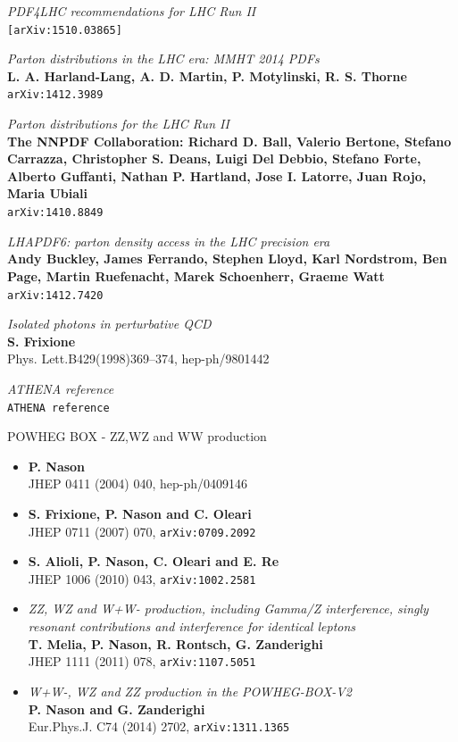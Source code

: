 \documentclass[11pt,a4paper,final]{report}
\begin{document}
\begin{thebibliography}{9}
	\textit{PDF4LHC recommendations for LHC Run II}\\
	\texttt{[arXiv:1510.03865]}	
	
	\textit{Parton distributions in the LHC era: MMHT 2014 PDFs}\\
	\textbf{L. A. Harland-Lang, A. D. Martin, P. Motylinski, R. S. Thorne}\\
	\texttt{arXiv:1412.3989}
	
	\textit{Parton distributions for the LHC Run II}\\
	\textbf{The NNPDF Collaboration: Richard D. Ball, Valerio Bertone, Stefano Carrazza, Christopher S. Deans, Luigi Del Debbio, Stefano Forte, Alberto Guffanti, Nathan P. Hartland, Jose I. Latorre, Juan Rojo, Maria Ubiali}\\
	\texttt{arXiv:1410.8849}
	
	\textit{LHAPDF6: parton density access in the LHC precision era}\\
	\textbf{Andy Buckley, James Ferrando, Stephen Lloyd, Karl Nordstrom, Ben Page, Martin Ruefenacht, Marek Schoenherr, Graeme Watt}\\
	\texttt{arXiv:1412.7420}

	\textit{Isolated photons in perturbative QCD}\\	
	\textbf{S. Frixione}\\
	Phys. Lett.B429(1998)369–374, hep-ph/9801442

	\textit{ATHENA reference}\\
	\texttt{ATHENA reference}
	
	POWHEG BOX - ZZ,WZ and WW production
	\begin{itemize}
	\item \textbf{P. Nason}\\
	JHEP 0411 (2004) 040, hep-ph/0409146
	\item \textbf{S. Frixione, P. Nason and C. Oleari}\\
	JHEP 0711 (2007) 070, \texttt{arXiv:0709.2092}
	\item \textbf{S. Alioli, P. Nason, C. Oleari and E. Re}\\
	JHEP 1006 (2010) 043, \texttt{arXiv:1002.2581}
	\item \textit{ZZ, WZ and W+W- production, including Gamma/Z interference, singly resonant contributions and interference for identical leptons}\\
	\textbf{T. Melia, P. Nason, R. Rontsch, G. Zanderighi}\\
	JHEP 1111 (2011) 078, \texttt{arXiv:1107.5051}
	\item \textit{W+W-, WZ and ZZ production in the POWHEG-BOX-V2}\\
	\textbf{P. Nason and G. Zanderighi}\\
	Eur.Phys.J. C74 (2014) 2702, \texttt{arXiv:1311.1365}
	\end{itemize}
	

\end{thebibliography}
\end{document}
